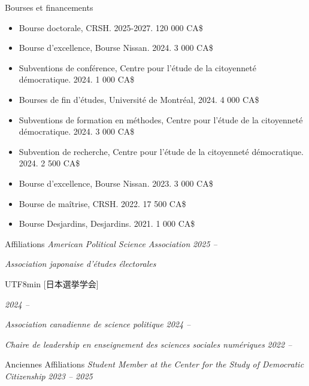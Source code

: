 \documentclass{resume} %
\begin{document}
\begin{rSection}{Bourses et financements}
\begin{itemize} 
  \item Bourse doctorale, CRSH. 2025-2027. 120 000 CA\$
  \item Bourse d'excellence, Bourse Nissan. 2024. 3 000 CA\$
  \item Subventions de conférence, Centre pour l'étude de la citoyenneté démocratique. 2024. 1 000 CA\$
  \item Bourses de fin d'études, Université de Montréal, 2024. 4 000 CA\$
  \item Subventions de formation en méthodes, Centre pour l'étude de la citoyenneté démocratique. 2024. 3 000 CA\$
  \item Subvention de recherche, Centre pour l'étude de la citoyenneté démocratique. 2024. 2 500 CA\$
  \item Bourse d'excellence, Bourse Nissan. 2023. 3 000 CA\$
  \item Bourse de maîtrise, CRSH. 2022. 17 500 CA\$
  \item Bourse Desjardins, Desjardins. 2021. 1 000 CA\$
\end{itemize}

\end{rSection}


\begin{rSection}{Affiliations} 
{\em American Political Science Association} \hfill{\em 2025 --} \par
{\em Association japonaise d'études électorales}\begin{CJK}{UTF8}{min} [日本選挙学会]\end{CJK} \hfill{\em 2024 -- } \par
{\em Association canadienne de science politique} \hfill{\em 2024 -- } \par
{\em Chaire de leadership en enseignement des sciences sociales numériques} \hfill{\em 2022 -- }
\end{rSection}

\begin{rSection}{Anciennes Affiliations}
{\em Student Member at the Center for the Study of Democratic Citizenship} \hfill{\em 2023 -- 2025} \par
\end{rSection}
\end{document}
